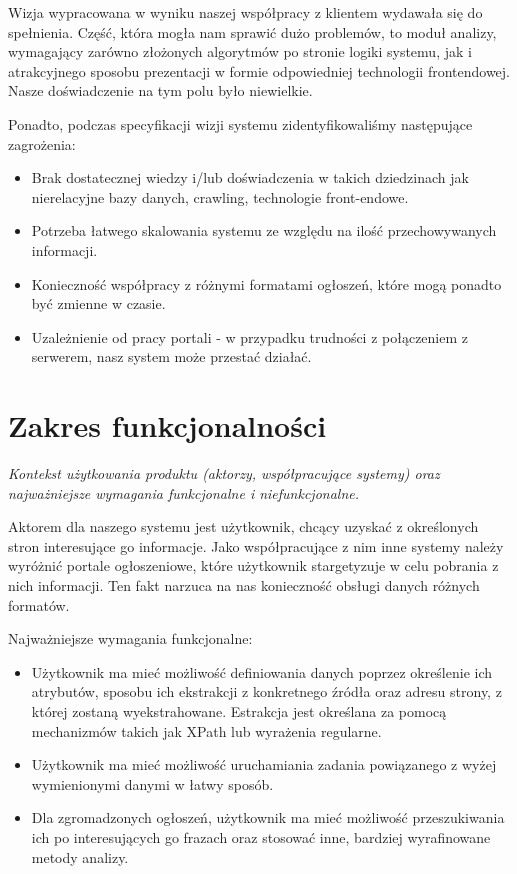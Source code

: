 \documentclass[polish,12pt]{aghthesis}
\begin{document}
Wizja wypracowana w wyniku naszej współpracy z klientem wydawała się do spełnienia.
Część, która mogła nam sprawić dużo problemów, to moduł analizy, wymagający
zarówno złożonych algorytmów po stronie logiki systemu, jak i atrakcyjnego
sposobu prezentacji w formie odpowiedniej technologii frontendowej. Nasze 
doświadczenie na tym polu było niewielkie.

Ponadto, podczas specyfikacji wizji systemu zidentyfikowaliśmy następujące zagrożenia:
\begin{itemize}
\item Brak dostatecznej wiedzy i/lub doświadczenia w takich dziedzinach jak nierelacyjne bazy danych, crawling, technologie front-endowe.
\item Potrzeba łatwego skalowania systemu ze względu na ilość przechowywanych informacji.
\item Konieczność współpracy z różnymi formatami ogłoszeń, które mogą ponadto być zmienne w czasie.
\item Uzależnienie od pracy portali - w przypadku trudności z połączeniem z serwerem, nasz system może przestać działać.
\end{itemize}

\section{Zakres funkcjonalności}
\label{sec:zakres-funkcjonalnosci}

\emph{Kontekst użytkowania produktu (aktorzy, współpracujące systemy)
  oraz najważniejsze wymagania funkcjonalne i niefunkcjonalne.}

Aktorem dla naszego systemu jest użytkownik, chcący uzyskać z określonych stron interesujące go informacje.
Jako współpracujące z nim inne systemy należy wyróżnić portale ogłoszeniowe, które użytkownik stargetyzuje
w celu pobrania z nich informacji. Ten fakt narzuca na nas konieczność obsługi danych różnych formatów.

Najważniejsze wymagania funkcjonalne:
\begin{itemize}
\item Użytkownik ma mieć możliwość definiowania danych poprzez określenie ich atrybutów,
sposobu ich ekstrakcji z konkretnego źródła oraz adresu strony, z której zostaną
wyekstrahowane. Estrakcja jest określana za pomocą mechanizmów takich jak XPath lub wyrażenia 
regularne.
\item Użytkownik ma mieć możliwość uruchamiania zadania powiązanego z wyżej
wymienionymi danymi w łatwy sposób.
\item Dla zgromadzonych ogłoszeń, użytkownik ma mieć możliwość przeszukiwania ich po
interesujących go frazach oraz stosować inne, bardziej wyrafinowane metody analizy.
\end{itemize}
\end{document}
